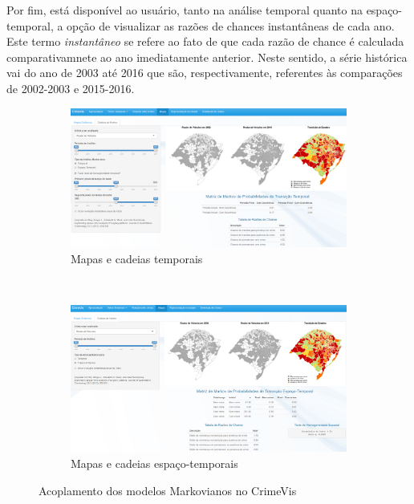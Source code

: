 \documentclass[12pt,openright,oneside,a4paper,english,french,spanish]{abntex2}
\numberwithin{table}{section} %
\numberwithin{figure}{section} %
\begin{document}
Por fim, está disponível ao usuário, tanto na análise temporal quanto na espaço-temporal, a opção de visualizar as razões de chances instantâneas de cada ano. Este termo \textit{instantâneo} se refere ao fato de que cada razão de chance é calculada comparativamnete ao ano imediatamente anterior. Neste sentido, a série histórica vai do ano de 2003 até 2016 que são, respectivamente, referentes às comparações de 2002-2003 e 2015-2016.


\begin{figure}[H]
\begin{center}
\begin{subfigure}{.95\textwidth}
  \centering
  \includegraphics[width=1.00\linewidth]{screenshot_crimevis_temporal_com_testes.png}
  \caption{Mapas e cadeias temporais}
  \label{fig:acoplamento_crimevis_temp}
\end{subfigure} \\ %
\vspace{0.75cm} %
\begin{subfigure}{.95\textwidth}
  \centering
  \includegraphics[width=1.00\linewidth]{screenshot_crimevis_espaco_temporal_com_testes.png}
  \caption{Mapas e cadeias espaço-temporais}
  \label{fig:acoplamento_crimevis_espaco_temp}
\end{subfigure}
\caption{Acoplamento dos modelos Markovianos no CrimeVis}
\label{fig:acoplamento_crimevis}
\end{center}
\end{figure}
\end{document}

